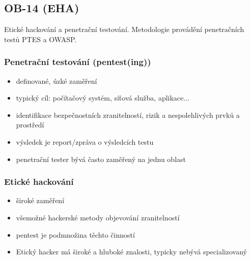 \subsection{OB-14 (EHA)}
Etické hackování a penetrační testování. Metodologie provádění penetračních testů PTES a OWASP.

\subsubsection*{Penetrační testování (pentest(ing))}
\begin{itemize}
	\item definované, úzké zaměření
	\item typický cíl: počítačový systém, síťová služba, aplikace...
	\item identifikace bezpečnostních zranitelností, rizik a nespolehlivých prvků a prostředí
	\item výsledek je report/zpráva o výsledcích testu
	\item penetrační tester bývá často zaměřený na jednu oblast
\end{itemize}

\subsubsection*{Etické hackování}
\begin{itemize}
	\item široké zaměření
	\item všemožné hackerské metody objevování zranitelností
	\item pentest je podmnožina těchto činností
	\item Etický hacker má široké a hluboké znalosti, typicky nebývá specializovaný
\end{itemize}

